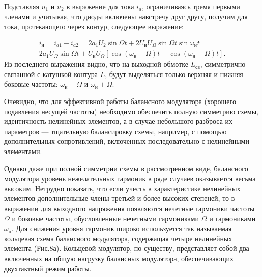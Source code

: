 Подставляя $u_1$ и $u_2$ в выражение для тока $i_a$, ограничиваясь тремя первыми членами и учитывая, что диоды включены навстречу друг другу, получим для тока, протекающего через контур, следующее выражение: 

\begin{gather*}
	i_{\text{н}} = i_{a1} - i_{a2} = 2a_1U_2 \sin{\Omega t} + 2U_{\text{н}} U_{\Omega}\sin{\Omega t} \sin{\omega_{\text{н}}t} = \\
	2a_1U_{\Omega} \sin{\Omega t} + U_{\text{н}} U_{\Omega}[\cos{(\omega_{\text{н}}-\Omega)t}-\cos{(\omega_{\text{н}}+\Omega)t}].
\end{gather*}
Из последнего выражения видно, что на выходной обмотке $L_{\text{св}}$, симметрично связанной с катушкой контура $L$, будут выделяться только верхняя и нижняя боковые частоты: $\omega_{\text{н}}-\Omega$ и $\omega_{\text{н}}+\Omega$.

Очевидно, что для эффективной работы балансного модулятора (хорошего подавления несущей частоты) необходимо обеспечить полную симметрию схемы, идентичность нелинейных элементов, а в случае небольшого разброса их параметров — тщательную балансировку схемы,
например, с помощью дополнительных сопротивлений, включенных последовательно с нелинейными элементами.

Однако даже при полной симметрии схемы в рассмотренном виде, балансного модулятора уровень нежелательных гармоник в ряде случаев оказывается весьма высоким. Нетрудно показать, что если учесть в характеристике нелинейных элементов дополнительные члены третьей и более высоких степеней, то в выражении для выходного напряжения появляются нечетные гармоники частоты $\Omega$ и боковые частоты, обусловленные нечетными гармониками $\Omega$ и гармониками $\omega_{\text{н}}$. Для снижения уровня гармоник широко используется так называемая кольцевая схема балансного модулятора, содержащая четыре нелинейных элемента (Рис.8а). Кольцевой модулятор, по существу, представляет собой два включенных на общую нагрузку балансных модулятора, обеспечивающих двухтактный режим работы. 

